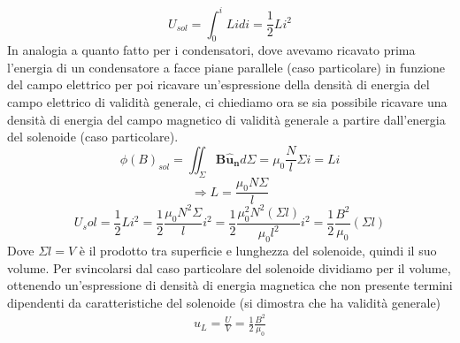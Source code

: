 \documentclass[
10pt, %
a4paper, %
oneside, %
headinclude,footinclude, %
BCOR5mm, %
]{scrartcl}
\begin{document}
\[U_{sol} = \int_{0}^{i}Lidi=\frac{1}{2}Li^2\]
In analogia a quanto fatto per i condensatori, dove avevamo ricavato prima l'energia di un condensatore a facce piane parallele (caso particolare) in funzione del campo elettrico per poi ricavare un'espressione della densità di energia del campo elettrico di validità generale, ci chiediamo ora se sia possibile ricavare una densità di energia del campo magnetico di validità generale a partire dall'energia del solenoide (caso particolare). 
\[\phi(B)_{sol} = \iint_{\Sigma}\mathbf{B}\mathbf{\hat{u}_n}d\Sigma = \mu_0 \frac{N}{l}\Sigma i = Li\]
\[\Rightarrow L = \frac{\mu_0 N\Sigma}{l}\]
\[U_sol = \frac{1}{2}Li^2 = \frac{1}{2}\frac{\mu_0 N^2\Sigma}{l}i^2=\frac{1}{2}\frac{\mu_0^2 N^2(\Sigma l)}{\mu_0 l^2}i^2=\frac{1}{2}\frac{B^2}{\mu_0}(\Sigma l)\]
Dove \(\Sigma l= V \) è il prodotto tra superficie e lunghezza del solenoide, quindi il suo volume. Per svincolarsi dal caso particolare del solenoide dividiamo per il volume, ottenendo un'espressione di densità di energia magnetica che non presente termini dipendenti da caratteristiche del solenoide (si dimostra che ha validità generale)
\begin{align}\label{eq:densità_energia_magnetica}
u_L = \frac{U}{V} =\frac{1}{2}\frac{B^2}{\mu_0} 
\end{align}
\end{document}
